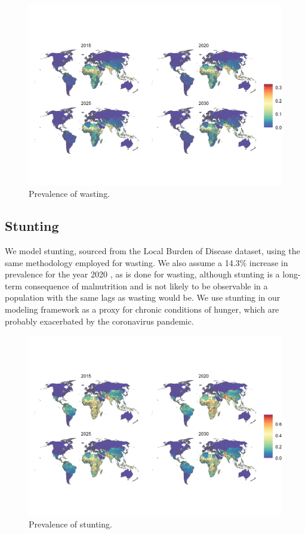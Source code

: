 \documentclass{article}
\begin{document}
\begin{figure}[H]
  \centering
  \includegraphics[width=\linewidth]{img/covars/wasting.png}
  \caption{Prevalence of wasting.}
\end{figure}

\pagebreak
\subsection{Stunting}
We model stunting, sourced from the Local Burden of Disease dataset, using the same methodology employed for wasting. We also assume a 14.3\% increase in prevalence for the year 2020 \citep{headey2020impacts}, as is done for wasting, although stunting is a long-term consequence of malnutrition and is not likely to be observable in a population with the same lags as wasting would be. We use stunting in our modeling framework as a proxy for chronic conditions of hunger, which are probably exacerbated by the coronavirus pandemic. 

\begin{figure}[H]
  \centering
  \includegraphics[width=\linewidth]{img/covars/stunting.png}
  \caption{Prevalence of stunting.}
\end{figure}
\end{document}
